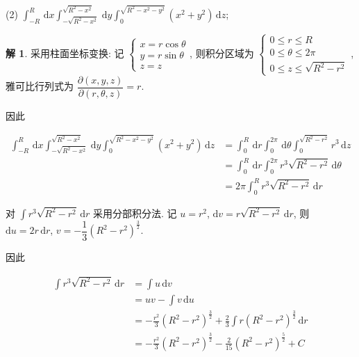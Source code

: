 \documentclass[a4paper,12pt]{article}
\theoremstyle{definition}
\newtheorem*{sol}{解}
\begin{document}
(2) $\displaystyle\int_{-R}^{R}\,\mathrm{d}x \int_{-\sqrt{R^2-x^2}}^{\sqrt{R^2-x^2}}\,\mathrm{d}y \int_{0}^{\sqrt{R^2-x^2-y^2}} (x^2+y^2) \, \mathrm{d}z$;
\begin{sol}
    采用柱面坐标变换: 记 $\begin{cases}
            x=r\cos\theta \\
            y=r\sin\theta \\
            z=z
        \end{cases}$, 则积分区域为 $\begin{cases}
            0\leq r\leq R        \\
            0\leq\theta\leq 2\pi \\
            0\leq z\leq \sqrt{R^2-r^2}
        \end{cases}$, 雅可比行列式为 $\dfrac{\partial(x,y,z)}{\partial(r,\theta,z)}=r$.

    因此

    \begin{align*}
        \int_{-R}^{R}\,\mathrm{d}x \int_{-\sqrt{R^2-x^2}}^{\sqrt{R^2-x^2}}\,\mathrm{d}y \int_{0}^{\sqrt{R^2-x^2-y^2}} (x^2+y^2) \, \mathrm{d}z
         & =\int_0^R\,\mathrm{d}r\int_0^{2\pi}\,\mathrm{d}\theta\int_0^{\sqrt{R^2-r^2}}r^3\,\mathrm{d}z \\
         & =\int_0^R\,\mathrm{d}r\int_0^{2\pi}r^3\sqrt{R^2-r^2}\,\mathrm{d}\theta                       \\
         & =2\pi\int_0^R r^3\sqrt{R^2-r^2}\,\mathrm{d}r
    \end{align*}

    对 $\displaystyle\int r^3\sqrt{R^2-r^2}\,\mathrm{d}r$ 采用分部积分法. 记 $u=r^2$, $\mathrm{d}v=r\sqrt{R^2-r^2}\,\mathrm{d}r$, 则 $\mathrm{d}u=2r\,\mathrm{d}r$, $v=-\dfrac{1}{3}(R^2-r^2)^{\frac{3}{2}}$.

    因此

    \begin{align*}
        \int r^3\sqrt{R^2-r^2}\,\mathrm{d}r
         & =\int u\,\mathrm{d}v                                                                         \\
         & =uv-\int v\,\mathrm{d}u                                                                      \\
         & =-\frac{r^2}{3}(R^2-r^2)^{\frac{3}{2}}+\frac{2}{3}\int r(R^2-r^2)^{\frac{3}{2}}\,\mathrm{d}r \\
         & =-\frac{r^2}{3}(R^2-r^2)^{\frac{3}{2}}-\frac{2}{15}(R^2-r^2)^{\frac{5}{2}}+C
    \end{align*}


\end{sol}
\end{document}
